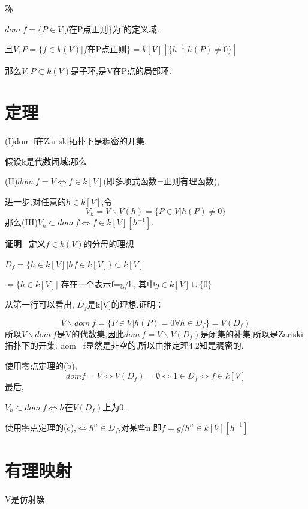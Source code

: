 \documentclass[UTF8]{book}
\begin{document}
		称

		\center  $dom \ f=\{P\in V\vert f$在P点正则$\}$为f的定义域.

						且$V,P=\{f\in k(V) \vert f$在P点正则$\}=k[V][\{h^{-1}\vert h(P)\neq 0\}]$

		\justifying
		那么$V,P\subset k(V)$是子环,是V在P点的局部环.
	\section{定理}
		(I)dom f在Zariski拓扑下是稠密的开集.

		假设k是代数闭域;那么

		(II)$dom \ f=V\iff f\in k[V]$(即多项式函数=正则有理函数),

		进一步,对任意的$h\in k[V]$,令
		\begin{equation*}
		V_{h}=V\backslash V(h)=\{P\in V \vert h(P)\neq 0\}
		\end{equation*}
		那么(III)$V_{h}\subset dom \ f \iff f\in k[V][h^{-1}]$.

		\textbf{证明} \ 定义$f\in k(V)$的分母的理想

		\center $ D_{f}=\{ h\in k[V] \vert hf\in k[V] \}\subset k[V]$




			  $ =\{ h\in k[V] \vert$ 存在一个表示f=g/h, 其中$g\in k[V]\cup \{0\}$

		\justifying

		从第一行可以看出, $D_{f}$是k[V]的理想.证明：

		\begin{equation*}
		V\backslash dom \ f=\{P\in V \vert h(P)= 0 \forall h\in D_{f}\}=V(D_{f})
		\end{equation*}
		所以$V\backslash dom \ f$是V的代数集,因此$dom \ f=V\backslash V(D_{f})$是闭集的补集,所以是Zariski拓扑下的开集. dom \ f显然是非空的,所以由推定理4.2知是稠密的.

		使用零点定理的(b),
		\begin{equation*}
		dom f=V\iff V(D_{f})=\emptyset \iff 1\in D_{f} \iff f\in k[V]
		\end{equation*}
		最后,

		$V_{h}\subset dom \ f \iff h $在$V(D_{f})$上为0,

		使用零点定理的(c),$\iff h^{n}\in D_{f}$,对某些n,即$f=g/h^{n}\in k[V][h^{-1}]$

	\section{有理映射}V是仿射簇
\end{document}
